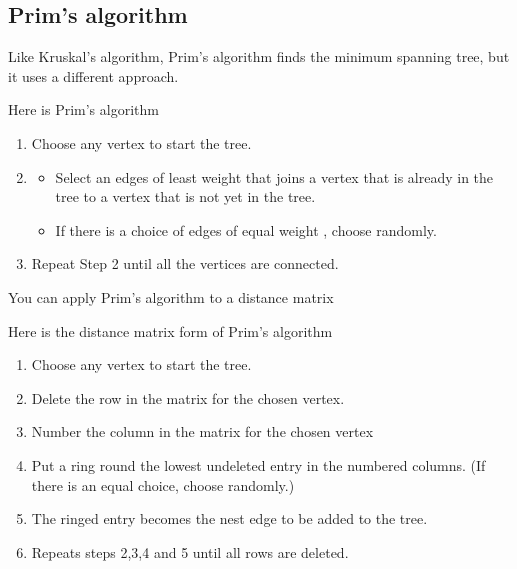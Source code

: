 \documentclass[a4paper]{article}
\begin{document}
\subsection{Prim's algorithm}
Like Kruskal's algorithm, Prim's algorithm finds the minimum spanning tree, but it uses a different approach.
\begin{defi}
	Here is Prim's algorithm
	\begin{enumerate}
		\item Choose any vertex to start the tree.
		\item \begin{itemize}
			      \item Select an edges of least weight that joins a vertex that is already in the tree to a vertex that is not yet in the tree.
			      \item If there is a choice of edges of equal weight , choose randomly.
		      \end{itemize}
		\item Repeat Step 2 until all the vertices are connected.
	\end{enumerate}
\end{defi}

\begin{eg}

\end{eg}

You can apply Prim's algorithm to a distance matrix
\begin{defi}
	Here is the distance matrix form of Prim's algorithm
	\begin{enumerate}
		\item Choose any vertex to start the tree.
		\item Delete the row in the matrix for the chosen vertex.
		\item Number the column in the matrix for the chosen vertex
		\item Put a ring round the lowest undeleted entry in the numbered columns. (If there is an equal choice, choose randomly.)
		\item The ringed entry becomes the nest edge to be added to the tree.
		\item Repeats steps 2,3,4 and 5 until all rows are deleted.
	\end{enumerate}
\end{defi}

\begin{eg}
	\begin{tabular}{c|ccccc}
	\end{tabular}
\end{eg}
\end{document}
